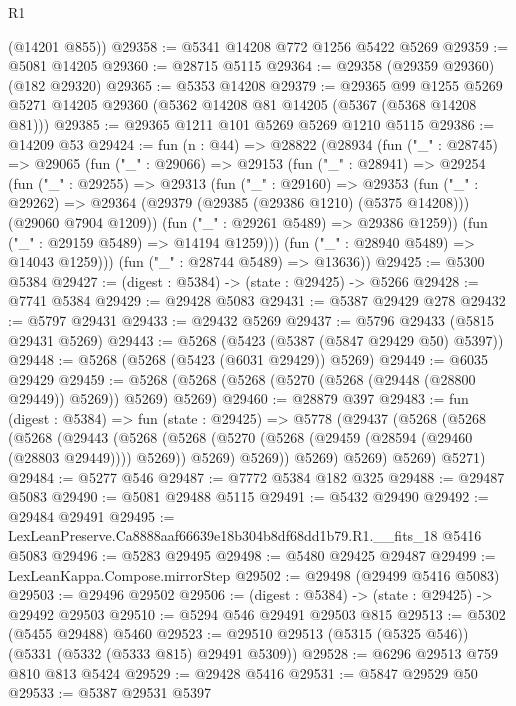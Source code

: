 \begin{lexlean}{R1}
\begin{coremodule}
      (@14201 @855))
@29358 := @5341 @14208 @772 @1256 @5422 @5269
@29359 := @5081 @14205
@29360 := @28715 @5115
@29364 := @29358 (@29359 @29360) (@182 @29320)
@29365 := @5353 @14208
@29379 := @29365
    @99
    @1255
    @5269
    @5271
    @14205
    @29360
    (@5362 @14208 @81 @14205 (@5367 (@5368 @14208 @81)))
@29385 := @29365 @1211 @101 @5269 @5269 @1210 @5115
@29386 := @14209 @53
@29424 := fun (n : @44) =>
  @28822
    (@28934
      (fun ("_" : @28745) =>
      @29065
        (fun ("_" : @29066) =>
        @29153
          (fun ("_" : @28941) =>
          @29254
            (fun ("_" : @29255) =>
            @29313
              (fun ("_" : @29160) =>
              @29353
                (fun ("_" : @29262) =>
                @29364 (@29379 (@29385 (@29386 @1210) (@5375 @14208))) (@29060 @7904 @1209))
                (fun ("_" : @29261 @5489) => @29386 @1259))
              (fun ("_" : @29159 @5489) => @14194 @1259)))
          (fun ("_" : @28940 @5489) => @14043 @1259)))
      (fun ("_" : @28744 @5489) => @13636))
@29425 := @5300 @5384
@29427 := (digest : @5384) -> (state : @29425) -> @5266
@29428 := @7741 @5384
@29429 := @29428 @5083
@29431 := @5387 @29429 @278
@29432 := @5797 @29431
@29433 := @29432 @5269
@29437 := @5796 @29433 (@5815 @29431 @5269)
@29443 := @5268 (@5423 (@5387 (@5847 @29429 @50) @5397))
@29448 := @5268 (@5268 (@5423 (@6031 @29429)) @5269)
@29449 := @6035 @29429
@29459 := @5268 (@5268 (@5268 (@5270 (@5268 (@29448 (@28800 @29449)) @5269)) @5269) @5269)
@29460 := @28879 @397
@29483 := fun (digest : @5384) =>
  fun (state : @29425) =>
  @5778
    (@29437
      (@5268
        (@5268
          (@5268
            (@29443
              (@5268
                (@5268 (@5270 (@5268 (@29459 (@28594 (@29460 (@28803 @29449)))) @5269)) @5269)
                @5269))
            @5269)
          @5269)
        @5269)
      @5271)
@29484 := @5277 @546
@29487 := @7772 @5384 @182 @325
@29488 := @29487 @5083
@29490 := @5081 @29488 @5115
@29491 := @5432 @29490
@29492 := @29484 @29491
@29495 := LexLeanPreserve.Ca8888aaf66639e18b304b8df68dd1b79.R1.__fits_18 @5416 @5083
@29496 := @5283 @29495
@29498 := @5480 @29425 @29487
@29499 := LexLeanKappa.Compose.mirrorStep
@29502 := @29498 (@29499 @5416 @5083)
@29503 := @29496 @29502
@29506 := (digest : @5384) -> (state : @29425) -> @29492 @29503
@29510 := @5294 @546 @29491 @29503 @815
@29513 := @5302 (@5455 @29488) @5460
@29523 := @29510 @29513 (@5315 (@5325 @546)) (@5331 (@5332 (@5333 @815) @29491 @5309))
@29528 := @6296 @29513 @759 @810 @813 @5424
@29529 := @29428 @5416
@29531 := @5847 @29529 @50
@29533 := @5387 @29531 @5397

\end{coremodule}
\end{lexlean}
